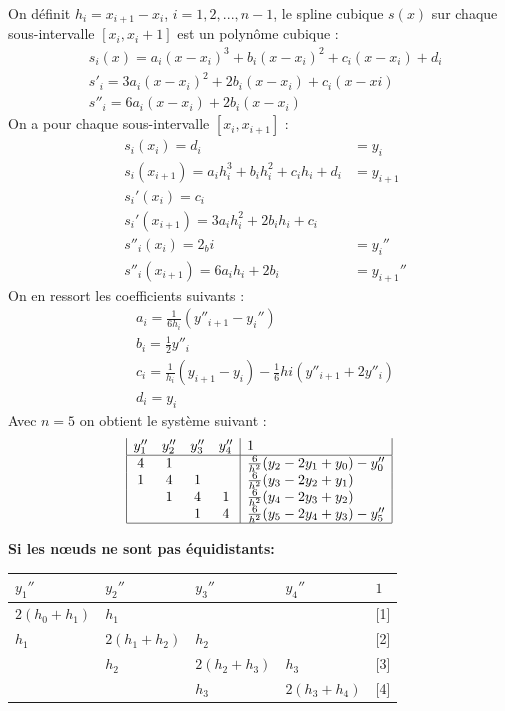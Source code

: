\documentclass[a4paper,9pt]{extarticle}
\begin{document}
\begin{multicols*}{2}
On définit $h_i=x_{i+1}-x_i$, $i=1,2,...,n-1$, le spline cubique $s(x)$ sur chaque sous-intervalle $[x_i,x_i+1]$ est un polynôme cubique :
\begin{align*}
& s_i(x)=a_i(x-x_i)^3+b_i(x-x_i)^2+c_i(x-x_i)+d_i \\
& s'_i=3a_i(x-x_i)^2+2b_i(x-x_i)+c_i(x-xi) \\
& s''_i=6a_i(x-x_i)+2b_i(x-x_i)
\end{align*}
On a pour chaque sous-intervalle $[x_i,x_{i+1}]$ :
\begin{align*}
& s_i(x_i) = d_i &= y_i\\
& s_i(x_{i+1}) = a_ih_i^3+b_ih_i^2+c_ih_i+d_i &= y_{i+1}\\
& s_i'(x_i) = c_i\\
& s_i'(x_{i+1}) = 3a_ih_i^2+2b_ih_i+c_i \\
& s''_i(x_i) = 2_bi &=y_i''\\
& s''_i(x_{i+1}) = 6a_ih_i+2b_i &= y_{i+1}''
\end{align*}
On en ressort les coefficients suivants :
\begin{align*}
& a_i = \frac{1}{6h_i}(y''_{i+1}-y_i'')\\
& b_i = \frac{1}{2}y''_i\\
& c_i = \frac{1}{h_i}(y_{i+1}-y_i)-\frac{1}{6}hi(y''_{i+1}+2y''_i)\\
& d_i = y_i
\end{align*}
Avec $n=5$ on obtient le système suivant :
$$
\begin{array}{|cccc|l|}
y_1'' & y_2'' & y_3'' & y_4'' & 1 \\
\hline
4 & 1 &   &   & \frac{6}{h^2}(y_2-2y_1+y_0)-y''_0 \\
1 & 4 & 1 &   & \frac{6}{h^2}(y_3-2y_2+y_1) \\
  & 1 & 4 & 1 & \frac{6}{h^2}(y_4-2y_3+y_2) \\
  &   & 1 & 4 & \frac{6}{h^2}(y_5-2y_4+y_3)-y''_5 \\ \hline
\end{array}
$$

\textbf{Si les nœuds ne sont pas équidistants:}

\begin{tabular}{|llll|l|}
$y_1''$      & $y_2''$      & $y_3''$      & $y_4''$      & $1$ \\ \hline
$2(h_0+h_1)$ & $h_1$        &              &              & [1]\\
$h_1$        & $2(h_1+h_2)$ & $h_2$        &              & [2]\\
             & $h_2$        & $2(h_2+h_3)$ & $h_3$        & [3]\\
             &              & $h_3$        & $2(h_3+h_4)$ & [4]
\end{tabular}


\end{multicols*}
\end{document}
